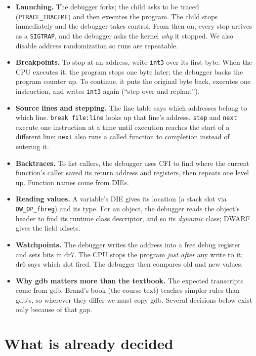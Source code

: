 \documentclass[10pt]{article}
\newcommand{\code}[1]{\texttt{\small #1}}
\begin{document}
\begin{itemize}
\item \textbf{Launching.} The debugger forks; the child asks to be traced (\code{PTRACE\_TRACEME}) and then executes the program. The child stops immediately and the debugger takes control. From then on, every stop arrives as a \code{SIGTRAP}, and the debugger asks the kernel \emph{why} it stopped. We also disable address randomization so runs are repeatable.
\item \textbf{Breakpoints.} To stop at an address, write \code{int3} over its first byte. When the CPU executes it, the program stops one byte later; the debugger backs the program counter up. To continue, it puts the original byte back, executes one instruction, and writes \code{int3} again (``step over and replant'').
\item \textbf{Source lines and stepping.} The line table says which addresses belong to which line. \code{break file:line} looks up that line's address. \code{step} and \code{next} execute one instruction at a time until execution reaches the start of a different line; \code{next} also runs a called function to completion instead of entering it.
\item \textbf{Backtraces.} To list callers, the debugger uses CFI to find where the current function's caller saved its return address and registers, then repeats one level up. Function names come from DIEs.
\item \textbf{Reading values.} A variable's DIE gives its location (a stack slot via \code{DW\_OP\_fbreg}) and its type. For an object, the debugger reads the object's header to find its runtime class descriptor, and so its \emph{dynamic} class; DWARF gives the field offsets.
\item \textbf{Watchpoints.} The debugger writes the address into a free debug register and sets bits in dr7. The CPU stops the program \emph{just after} any write to it; dr6 says which slot fired. The debugger then compares old and new values.
\item \textbf{Why gdb matters more than the textbook.} The expected transcripts come from gdb. Brand's book (the course text) teaches simpler rules than gdb's, so wherever they differ we must copy gdb. Several decisions below exist only because of that gap.
\end{itemize}

\section{What is already decided}\label{sec:lo5}
\end{document}
